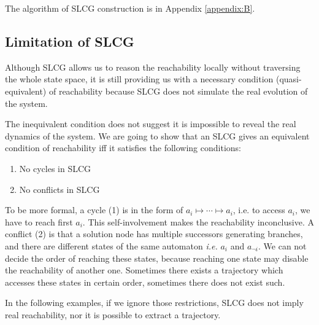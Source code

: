 \documentclass[runningheads]{llncs}
\begin{document}
The algorithm of SLCG construction is in Appendix \ref{appendix:B}.


\subsection{Limitation of SLCG}\label{limitation}
Although SLCG allows us to reason the reachability locally without traversing the whole state space, it is still providing us with a necessary condition (quasi-equivalent) of reachability because SLCG does not simulate the real evolution of the system.

The inequivalent condition does not suggest it is impossible to reveal the real dynamics of the system.
We are going to show that an SLCG gives an equivalent condition of reachability iff it satisfies the following conditions:

\begin{enumerate}
\item No cycles in SLCG
\item No conflicts in SLCG

\end{enumerate}
To be more formal, a cycle (1) is in the form of $a_i\mapsto\cdots\mapsto a_i$, i.e. to access $a_i$, we have to reach first $a_i$. This self-involvement makes the reachability inconclusive. 
A conflict (2) is that a solution node has multiple successors generating branches, and there are different states of the same automaton \textit{i.e.} $a_i$ and $a_{\lnot i}$. 
We can not decide the order of reaching these states, because reaching one state may disable the reachability of another one.
Sometimes there exists a trajectory which accesses these states in certain order, sometimes there does not exist such.

In the following examples, if we ignore those restrictions, SLCG does not imply real reachability, nor it is possible to extract a trajectory.
\end{document}
